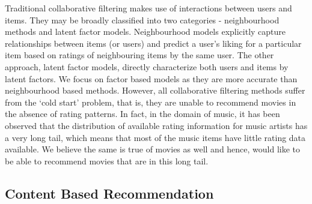 \documentclass{article} %
\begin{document}
Traditional collaborative filtering makes use of interactions between users and 
items. They may be broadly classified into two categories - neighbourhood methods and latent factor models. Neighbourhood models explicitly capture relationships between items (or users) and predict a user's liking for a particular item based on ratings of neighbouring items by the same user. The other approach, latent
factor models, directly characterize both users and items by latent factors. We focus on factor based models as they are more accurate than neighbourhood based 
methods. However, all collaborative filtering methods suffer from the `cold 
start' problem, that is, 
they are unable to recommend movies in the absence of rating patterns. In fact, 
in the domain of music, it has been observed \cite{music-long-tail} that the 
distribution of available rating information for music artists has a very long 
tail, which means that most of the music items have little rating data available. We believe the same is true of movies as well and hence, would like to be able to recommend movies that are in this long tail. 


%


\subsection{Content Based Recommendation}
\end{document}
